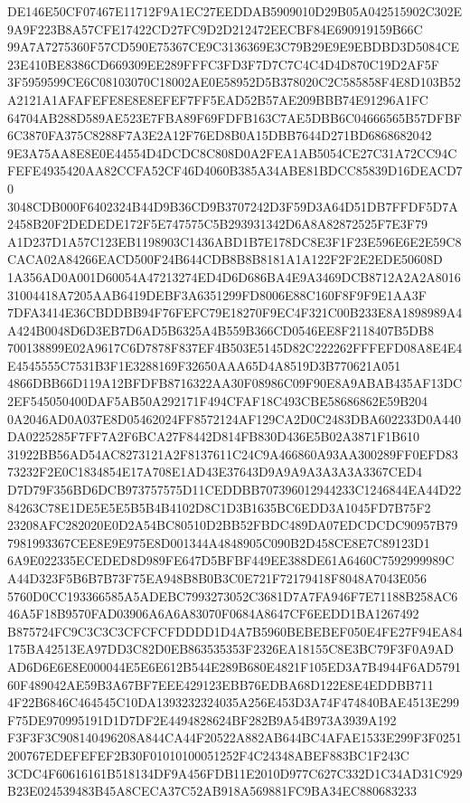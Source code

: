 \documentclass[UTF8,fontset=fandol,zihao=-4,a4paper]{ctexart}
\begin{document}
{{DE146E50CF07467E11712F9A1EC27EEDDAB5909010D29B05A042515902C302E9A9F223B8A57CFE17422CD27FC9D2D212472EECBF84E690919159B66C
99A7A7275360F57CD590E75367CE9C3136369E3C79B29E9E9EBDBD3D5084CE23E410BE8386CD669309EE289FFFC3FD3F7D7C7C4C4D4D870C19D2AF5F
3F5959599CE6C08103070C18002AE0E58952D5B378020C2C585858F4E8D103B52A2121A1AFAFEFE8E8E8EFEF7FF5EAD52B57AE209BBB74E91296A1FC
64704AB288D589AE523E7FBA89F69FDFB163C7AE5DBB6C04666565B57DFBF6C3870FA375C8288F7A3E2A12F76ED8B0A15DBB7644D271BD6868682042
9E3A75AA8E8E0E44554D4DCDC8C808D0A2FEA1AB5054CE27C31A72CC94CFEFE4935420AA82CCFA52CF46D4060B385A34ABE81BDCC85839D16DEACD70
3048CDB000F6402324B44D9B36CD9B3707242D3F59D3A64D51DB7FFDF5D7A2458B20F2DEDEDE172F5E747575C5B293931342D6A8A82872525F7E3F79
A1D237D1A57C123EB1198903C1436ABD1B7E178DC8E3F1F23E596E6E2E59C8CACA02A84266EACD500F24B644CDB8B8B8181A1A122F2F2E2EDE50608D
1A356AD0A001D60054A47213274ED4D6D686BA4E9A3469DCB8712A2A2A801631004418A7205AAB6419DEBF3A6351299FD8006E88C160F8F9F9E1AA3F
7DFA3414E36CBDDBB94F76FEFC79E18270F9EC4F321C00B233E8A1898989A4A424B0048D6D3EB7D6AD5B6325A4B559B366CD0546EE8F2118407B5DB8
700138899E02A9617C6D7878F837EF4B503E5145D82C222262FFFEFD08A8E4E4E4545555C7531B3F1E3288169F32650AAA65D4A8519D3B770621A051
4866DBB66D119A12BFDFB8716322AA30F08986C09F90E8A9ABAB435AF13DC2EF545050400DAF5AB50A292171F494CFAF18C493CBE58686862E59B204
0A2046AD0A037E8D05462024FF8572124AF129CA2D0C2483DBA602233D0A440DA0225285F7FF7A2F6BCA27F8442D814FB830D436E5B02A3871F1B610
31922BB56AD54AC8273121A2F8137611C24C9A466860A93AA300289FF0EFD8373232F2E0C1834854E17A708E1AD43E37643D9A9A9A3A3A3A3367CED4
D7D79F356BD6DCB973757575D11CEDDBB707396012944233C1246844EA44D2284263C78E1DE5E5E5B5B4B4102D8C1D3B1635BC6EDD3A1045FD7B75F2
23208AFC282020E0D2A54BC80510D2BB52FBDC489DA07EDCDCDC90957B797981993367CEE8E9E975E8D001344A4848905C090B2D458CE8E7C89123D1
6A9E022335ECEDED8D989FE647D5BFBF449EE388DE61A6460C7592999989CA44D323F5B6B7B73F75EA948B8B0B3C0E721F72179418F8048A7043E056
5760D0CC193366585A5ADEBC7993273052C3681D7A7FA946F7E71188B258AC646A5F18B9570FAD03906A6A6A83070F0684A8647CF6EEDD1BA1267492
B875724FC9C3C3C3CFCFCFDDDD1D4A7B5960BEBEBEF050E4FE27F94EA84175BA42513EA97DD3C82D0EB863535353F2326EA18155C8E3BC79F3F0A9AD
AD6D6E6E8E000044E5E6E612B544E289B680E4821F105ED3A7B4944F6AD579160F489042AE59B3A67BF7EEE429123EBB76EDBA68D122E8E4EDDBB711
4F22B6846C464545C10DA1393232324035A256E453D3A74F474840BAE4513E299F75DE970995191D1D7DF2E4494828624BF282B9A54B973A3939A192
F3F3F3C908140496208A844CA44F20522A882AB644BC4AFAE1533E299F3F0251200767EDEFEFEF2B30F01010100051252F4C24348ABEF883BC1F243C
3CDC4F60616161B518134DF9A456FDB11E2010D977C627C332D1C34AD31C929B23E024539483B45A8CECA37C52AB918A569881FC9BA34EC880683233
}}
\end{document}
